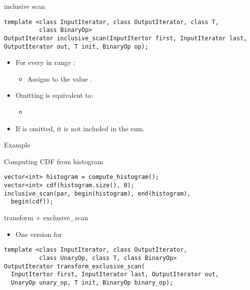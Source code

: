 \begin{frame}[t,fragile]{inclusive scan}
\begin{lstlisting}[]
template <class InputIterator, class OutputIterator, class T, 
          class BinaryOp>
OutputIterator inclusive_scan(InputItertor first, InputIterator last, OutputIterator out, T init, BinaryOp op);
\end{lstlisting}
\begin{itemize}
  \item For every  in range \cppid{[out, out + (last-first))}:
    \begin{itemize}
      \item Assigns to  the value 
        .
    \end{itemize}
  \vfill
  \item Omitting  is equivalent to:
    \begin{itemize}
      \item {}
    \end{itemize}
  \item If  is omitted, it is not included in the sum.
\end{itemize}
\end{frame}

\begin{frame}[t,fragile]{Example}
\begin{block}{Computing CDF from histogram}
\begin{lstlisting}[]
vector<int> histogram = compute_histogram();
vector<int> cdf(histogram.size(), 0);
inclusive_scan(par, begin(histogram), end(histogram),
  begin(cdf));
\end{lstlisting}
\end{block}
\end{frame}

\begin{frame}[t,fragile]{transform + exclusive\_scan}
\begin{itemize}
  \item One version for 
\end{itemize}
\begin{lstlisting}[]
template <class InputIterator, class OutputIterator, 
          class UnaryOp, class T, class BinaryOp>
OutputIterator transform_exclusive_scan(
  InputItertor first, InputIterator last, OutputIterator out, 
  UnaryOp unary_op, T init, BinaryOp binary_op);
\end{lstlisting}
\end{frame}

